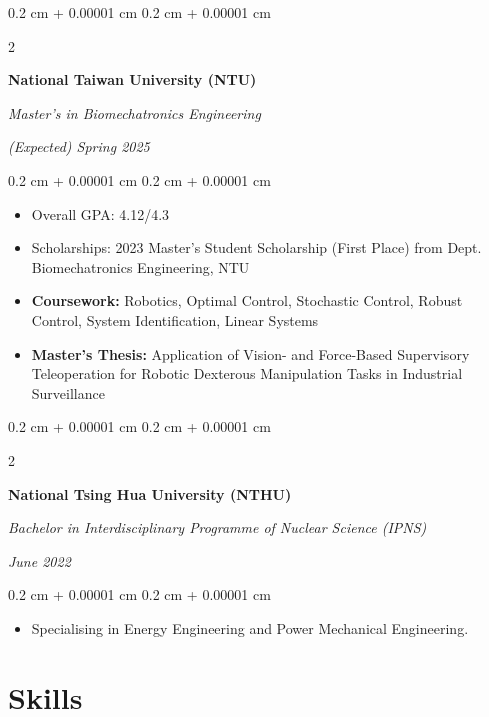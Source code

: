 \documentclass[10pt, letterpaper]{article}
\newenvironment{highlights}{
    \begin{itemize}[
        topsep=0.10 cm,
        parsep=0.10 cm,
        partopsep=0pt,
        itemsep=0pt,
        leftmargin=0.4 cm + 10pt
    ]
}{
    \end{itemize}
} %
\newenvironment{onecolentry}{
    \begin{adjustwidth}{
        0.2 cm + 0.00001 cm
    }{
        0.2 cm + 0.00001 cm
    }
}{
    \end{adjustwidth}
} %
\newenvironment{twocolentry}[2][]{
    \onecolentry
    \def\secondColumn{#2}
    \setcolumnwidth{\fill, 4.5 cm}
    \begin{paracol}{2}
}{
    \switchcolumn \raggedleft \secondColumn
    \end{paracol}
    \endonecolentry
} %
\begin{document}
        \begin{twocolentry}{
            
            
        \textit{(Expected) Spring 2025}}
            \textbf{National Taiwan University (NTU)}

            \textit{Master's in Biomechatronics Engineering}
        \end{twocolentry}

        \vspace{0.10 cm}
        \begin{onecolentry}
            \begin{highlights}
                \item Overall GPA: 4.12/4.3
                \item Scholarships: 2023 Master's Student Scholarship (First Place) from Dept. Biomechatronics Engineering, NTU
                \item \textbf{Coursework:} Robotics, Optimal Control, Stochastic Control, Robust Control, System Identification, Linear Systems
                \item \textbf{Master's Thesis:} Application of Vision- and Force-Based Supervisory Teleoperation for Robotic Dexterous Manipulation Tasks in Industrial Surveillance
            \end{highlights}
        \end{onecolentry}

        \vspace{0.2 cm}

        \begin{twocolentry}{
            
        \textit{June 2022}}
            \textbf{National Tsing Hua University (NTHU)}
            
            \textit{Bachelor in Interdisciplinary Programme of Nuclear Science (IPNS)}
        \end{twocolentry}
        \vspace{0.10 cm}
        \begin{onecolentry}
            \begin{highlights}
                \item Specialising in Energy Engineering and Power Mechanical Engineering.
            \end{highlights}
        \end{onecolentry}


    \section{Skills}
\end{document}
